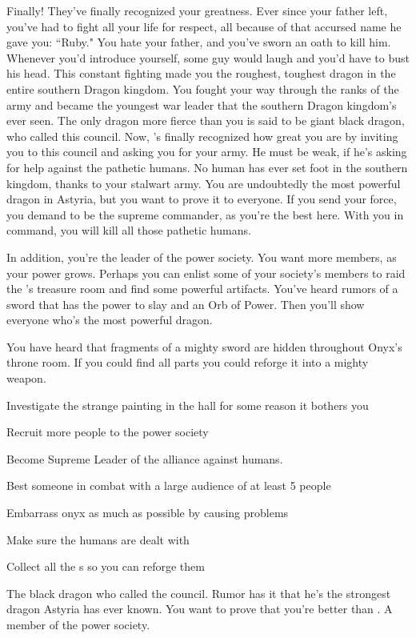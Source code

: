 \documentclass[char]{guildcamp2}
\begin{document}
\name{\cRed{}}

		
		Finally! They've finally recognized your greatness. Ever since your father left, you've had to fight all your life for respect, all because of that accursed name he gave you: ``Ruby." You hate your father, and you've sworn an oath to kill him. Whenever you'd introduce yourself, some guy would laugh and you'd have to bust his head. This constant fighting made you the roughest, toughest dragon in the entire southern Dragon kingdom. You fought your way through the ranks of the army and became the youngest war leader that the southern Dragon kingdom's ever seen. The only dragon more fierce than you is said to be giant black dragon, \cOnyx{} who called this council. Now, \cOnyx{\they}'s finally recognized how great you are by inviting you to this council and asking you for your army. He must be weak, if he's asking for help against the pathetic humans. No human has ever set foot in the southern kingdom, thanks to your stalwart army. You are undoubtedly the most powerful dragon in Astyria, but you want to prove it to everyone. If you send your force, you demand to be the supreme commander, as you're the best here.  With you in command, you will kill all those pathetic humans.
		
In addition, you're the leader of the power society. You want more members, as your power grows. Perhaps you can enlist some of your society's members to raid the \cOnyx{}'s treasure room and find some powerful artifacts. You've heard rumors of a sword that has the power to slay \cOnyx{} and an Orb of Power. Then you'll show everyone who's the most powerful dragon. 

You have heard that fragments of a mighty sword are hidden throughout Onyx's throne room. If you could find all parts you could reforge it into a mighty weapon.		

	\begin{itemz}[Goals]
  \item Investigate the strange painting in the hall for some reason it bothers you
	\item Recruit more people to the power society
	\item Become Supreme Leader of the alliance against humans.
	\item Best someone in combat with a large audience of at least 5 people
	\item Embarrass onyx as much as possible by causing problems
	\item Make sure the humans are dealt with
	\item Collect all the \iVorpalSwordofWonder{}s so you can reforge them
\end{itemz}

\begin{contacts}
  \contact{\cOnyx{}} The black dragon who called the council. Rumor has it that he's the strongest dragon Astyria has ever known. You want to prove that you're better than \cOnyx{\them}.
	\contact{\cMinotaur{}} A member of the power society.
	
\end{contacts}
\end{document}
